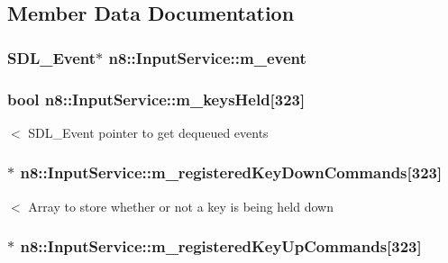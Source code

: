 \subsection{Member Data Documentation}
\hypertarget{classn8_1_1_input_service_a9eab1e8bff2306d4e581175d0d683184}{
\subsubsection[{m\-\_\-event}]{\setlength{\rightskip}{0pt plus 5cm}S\-D\-L\-\_\-\-Event$\ast$ n8\-::\-Input\-Service\-::m\-\_\-event\hspace{0.3cm}{\ttfamily [private]}}}\label{classn8_1_1_input_service_a9eab1e8bff2306d4e581175d0d683184}
\hypertarget{classn8_1_1_input_service_ac35485b7fde20abe519f9deebc813eb2}{
\subsubsection[{m\-\_\-keys\-Held}]{\setlength{\rightskip}{0pt plus 5cm}bool n8\-::\-Input\-Service\-::m\-\_\-keys\-Held\mbox{[}323\mbox{]}\hspace{0.3cm}{\ttfamily [private]}}}\label{classn8_1_1_input_service_ac35485b7fde20abe519f9deebc813eb2}
$<$ S\-D\-L\-\_\-\-Event pointer to get dequeued events \hypertarget{classn8_1_1_input_service_a7ac30fbb458b6b41138a1a9ae76e3497}{
\subsubsection[{m\-\_\-registered\-Key\-Down\-Commands}]{$\ast$ n8\-::\-Input\-Service\-::m\-\_\-registered\-Key\-Down\-Commands\mbox{[}323\mbox{]}\hspace{0.3cm}{\ttfamily [private]}}}\label{classn8_1_1_input_service_a7ac30fbb458b6b41138a1a9ae76e3497}
$<$ Array to store whether or not a key is being held down \hypertarget{classn8_1_1_input_service_a3f222cabde1339a524d0a9ca70bc1d3f}{
\subsubsection[{m\-\_\-registered\-Key\-Up\-Commands}]{$\ast$ n8\-::\-Input\-Service\-::m\-\_\-registered\-Key\-Up\-Commands\mbox{[}323\mbox{]}\hspace{0.3cm}{\ttfamily [private]}}}\label{classn8_1_1_input_service_a3f222cabde1339a524d0a9ca70bc1d3f}


